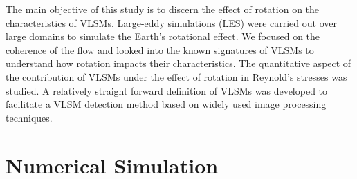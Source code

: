 \documentclass{svjour3}                     %
\begin{document}
The main objective of this study is to discern the effect of rotation on the characteristics of VLSMs.  Large-eddy simulations (LES) were carried out over large domains to simulate the Earth's rotational effect.  We focused on the coherence of the flow and looked into the  known  signatures of VLSMs to understand how rotation impacts their characteristics.  The quantitative aspect of the contribution of VLSMs under the effect of rotation in Reynold's stresses was studied.  A relatively straight forward  definition of VLSMs was developed to facilitate a VLSM detection method based on widely used image processing techniques. 

\section{Numerical Simulation}
\end{document}
